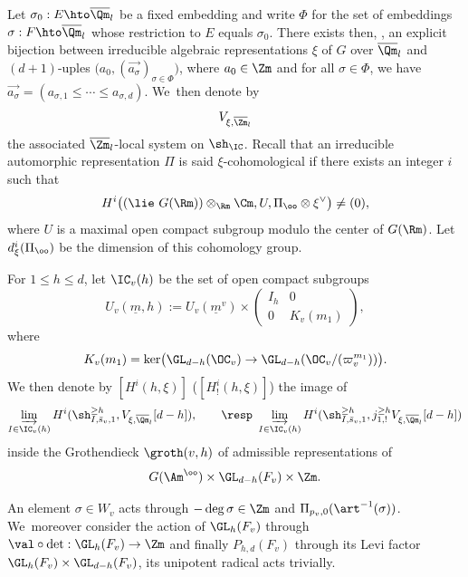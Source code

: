 Let $\sigma_0:E \hto
\overline{\Qm}_l$ be a fixed embedding and write $\Phi$ for the set of embeddings
$\sigma:F \hto \overline \Qm_l$ whose restriction to $E$ equals $\sigma_0$.
There exists then, \cf \cite[p.\,97]{h-t}, an explicit bijection between irreducible algebraic representations
$\xi$ of $G$ over $\overline \Qm_l$ and $(d+1)$-uples
$\bigl (a_0, (\overrightarrow{a_\sigma})_{\sigma \in \Phi} \bigr)$,
where $a_0 \in \Zm$ and for all $\sigma \in \Phi$, we have \hbox{$\overrightarrow{a_\sigma}=
(a_{\sigma,1} \leq \cdots \leq a_{\sigma,d})$}.
We~then denote by
\[
V_{\xi,\overline \Zm_l}
\]
the associated $\overline \Zm_l$-local system on $\sh_\IC$.
Recall that an irreducible automorphic representation $\Pi$ is said $\xi$-cohomological if there exists
an integer $i$ such that
\[
H^i \bigl ((\lie ~G(\Rm)) \otimes_\Rm \Cm,U,\Pi_\oo \otimes \xi^\vee \bigr) \neq (0),
\]
where $U$ is a maximal open compact subgroup modulo the center of $G(\Rm)$.
Let $d_\xi^i(\Pi_\oo)$ be the dimension of this cohomology group.

\label{para-hecke}

\begin{nota} \label{nota-hixi}
For $1 \leq h \leq d$, let $\IC_v(h)$ be the set of open compact subgroups
\[
U_v(\underline m,h):=
U_v(\underline m^v) \times \left (\begin{array}{cc} I_h & 0 \\ 0 & K_v(m_1) \end{array} \right),
\]
where
\[
K_v(m_1)=\ker \bigl (\GL_{d-h}(\OC_v) \to \GL_{d-h}(\OC_v/ (\varpi_v^{m_1})) \bigr).
\]
We then denote by $[H^i(h,\xi)]$ (\resp $[H^i_!(h,\xi)]$) the image of
\[
\varinjlim_{{I \in \IC_v(h)}} H^i(\sh_{I,\bar s_v,1}^{\geq h}, V_{\xi,\overline \Qm_l}[d-h]),
\qquad \hbox{\resp }
\varinjlim_{{I \in \IC_v(h)}} H^i(\sh_{I,\bar s_v,1}^{\geq h}, j^{\geq h}_{1,!} V_{\xi,\overline \Qm_l}[d-h])
\]
inside the Grothendieck $\groth(v,h)$ of admissible representations of
\[
G(\Am^{\oo}) \times \GL_{d-h}(F_v) \times \Zm.
\]
\end{nota}

\begin{remark}
An element $\sigma \in W_v$ acts through $-\deg \sigma \in \Zm$ and $\Pi_{p_v,0}(\art^{-1} (\sigma))$.
We~moreover consider the action of $\GL_{h}(F_v)$ through
$\val \circ \det: \GL_{h}(F_v) \to \Zm$ and finally
$P_{h,d}(F_v)$ through its Levi factor $\GL_{h}(F_v) \times \GL_{d-h}(F_v)$, \ie its unipotent radical acts trivially.
\end{remark}

